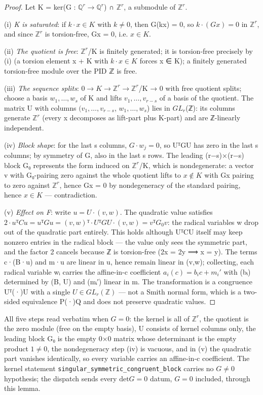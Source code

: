 \documentclass[11pt]{article}
\theoremstyle{plain}
\theoremstyle{definition}
\theoremstyle{remark}
\theoremstyle{plain}
\theoremstyle{definition}
\theoremstyle{remark}
\theoremstyle{plain}
\theoremstyle{definition}
\theoremstyle{remark}
\begin{document}
\begin{proof}
Let K = ker(G : $ℚ^{r} → ℚ^{r}$) ∩ $ℤ^{r}$, a submodule of $ℤ^{r}$.

(i) \emph{K is saturated}: if $k·x ∈ K$ with $k ≠ 0$, then G(kx) = 0, so $k·(Gx) = 0$ in $ℤ^{r}$, and since $ℤ^{r}$ is torsion-free, Gx = 0, i.e. $x ∈ K$.

(ii) \emph{The quotient is free}: $ℤ^{r}$/K is finitely generated; it is torsion-free precisely by (i) (a torsion element x + K with $k·x ∈ K$ forces x ∈ K); a finitely generated torsion-free module over the PID ℤ is free.

(iii) \emph{The sequence splits}: $0 → K → ℤ^{r} → ℤ^{r}$/K → 0 with free quotient splits; choose a basis $w_{1},…,w_{s}$ of K and lifts $v_{1},…,v_{r−s}$ of a basis of the quotient. The matrix U with columns $(v_{1},…,v_{r−s}$, $w_{1},…,w_{s}$) lies in $GL_{r}$(ℤ): its columns generate $ℤ^{r}$ (every x decomposes as lift-part plus K-part) and are ℤ-linearly independent.

(iv) \emph{Block shape}: for the last s columns, $G·w_{j} = 0$, so UᵀGU has zero in the last s columns; by symmetry of G, also in the last s rows. The leading (r−s)×(r−s) block G₀ represents the form induced on $ℤ^{r}$/K, which is nondegenerate: a vector v with G₀-pairing zero against the whole quotient lifts to $x ∉ K$ with Gx pairing to zero against $ℤ^{r}$, hence Gx = 0 by nondegeneracy of the standard pairing, hence $x ∈ K$ — contradiction.

(v) \emph{Effect on F}: write $u = U·(v, w)$. The quadratic value satisfies $2·uᵀCu = uᵀGu = (v,w)ᵀ·UᵀGU·(v,w) = vᵀG_{0}v$: the radical variables w drop out of the quadratic part entirely. This holds although UᵀCU itself may keep nonzero entries in the radical block — the value only sees the symmetric part, and the factor 2 cancels because ℤ is torsion-free (2x = 2y ⟹ x = y). The terms c·(B·u) and m·u are linear in u, hence remain linear in (v,w); collecting, each radical variable wᵢ carries the affine-in-c coefficient $a_{i}(c) = b_{i} c + m_{i}′$ with (bᵢ) determined by (B, U) and (mᵢ′) linear in m. The transformation is a congruence Uᵀ(·)U with a single $U ∈ GL_{r}(ℤ)$ — not a Smith normal form, which is a two-sided equivalence P(·)Q and does not preserve quadratic values.

\end{proof}
All five steps read verbatim when $G = 0$: the kernel is all of $ℤ^{r}$, the quotient is the zero module (free on the empty basis), U consists of kernel columns only, the leading block G₀ is the empty 0×0 matrix whose determinant is the empty product $1 ≠ 0$, the nondegeneracy step (iv) is vacuous, and in (v) the quadratic part vanishes identically, so every variable carries an affine-in-c coefficient. The kernel statement \texttt{singular\_\allowbreak{}symmetric\_\allowbreak{}congruent\_\allowbreak{}block} carries no $G ≠ 0$ hypothesis; the dispatch sends every $\mathrm{det} G = 0$ datum, $G = 0$ included, through this lemma.
\end{document}

